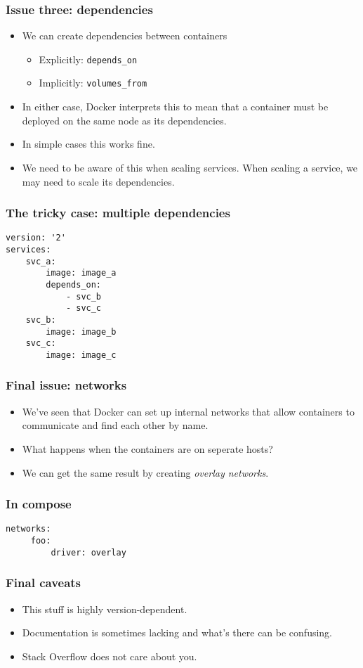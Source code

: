 \documentclass[10pt]{beamer}
\begin{document}
\begin{frame}
  \frametitle{Issue three: dependencies}
   
   \begin{itemize}
     \item We can create dependencies between containers
              \begin{itemize}
                \item Explicitly: \texttt{depends\_on}
                \item Implicitly: \texttt{volumes\_from}
              \end{itemize}
         
     \item In either case, Docker interprets this to mean that a container must be deployed on the same node as its dependencies.
     \item In simple cases this works fine.
     \item We need to be aware of this when scaling services. When scaling a service, we may need to scale its dependencies.
   \end{itemize}
\end{frame}


\begin{frame}[fragile]
    \frametitle{The tricky case: multiple dependencies}
    
    \begin{verbatim}
version: '2'
services:
    svc_a:  
        image: image_a
        depends_on:
            - svc_b
            - svc_c
    svc_b:  
        image: image_b
    svc_c:  
        image: image_c
    \end{verbatim}
\end{frame}

\begin{frame}
  \frametitle{Final issue: networks}
   
   \begin{itemize}
     \item We've seen that Docker can set up internal networks that allow containers to communicate and find each other by name.   
     \item What happens when the containers are on seperate hosts?
     \item We can get the same result by creating \emph{overlay networks}.
   \end{itemize}
\end{frame}

\begin{frame}[fragile]
    \frametitle{In compose}
     \begin{verbatim}
networks:
     foo:
         driver: overlay
     \end{verbatim}
 \end{frame}
 
 \begin{frame}
  \frametitle{Final caveats}
   
   \begin{itemize}
     \item This stuff is highly version-dependent.
     \item Documentation is sometimes lacking and what's there can be confusing.
     \item Stack Overflow does not care about you.
   \end{itemize}
\end{frame}    
 
\end{document}
